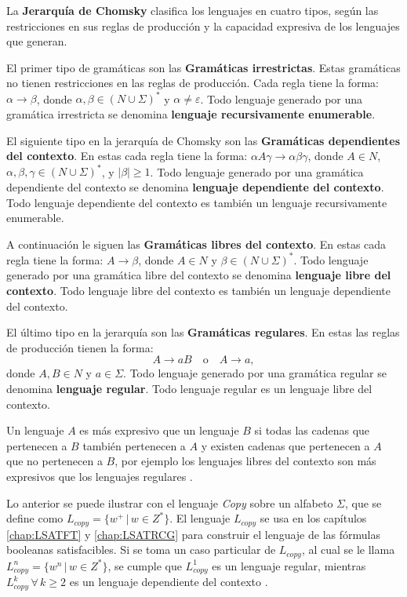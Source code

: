 La \textbf{Jerarquía de Chomsky} clasifica los lenguajes en cuatro tipos, según las restricciones en sus reglas de producción y la capacidad expresiva de los lenguajes que generan.

El primer tipo de gramáticas son las \textbf{Gramáticas irrestrictas}. Estas gramáticas no tienen restricciones en las reglas de producción.
Cada regla tiene la forma: \(\alpha \to \beta\), donde \(\alpha, \beta \in (N \cup \Sigma)^*\) y \(\alpha \neq \varepsilon\).
Todo lenguaje generado por una gramática irrestricta se denomina \textbf{lenguaje recursivamente enumerable}.

El siguiente tipo en la jerarquía de Chomsky son las \textbf{Gramáticas dependientes del contexto}. En estas cada regla tiene la forma: \(\alpha A \gamma \to \alpha \beta \gamma\), donde \(A \in N\), \(\alpha, \beta, \gamma \in (N \cup \Sigma)^*\), y \(|\beta| \geq 1\).
Todo lenguaje generado por una gramática dependiente del contexto se denomina \textbf{lenguaje dependiente del contexto}.
Todo lenguaje dependiente del contexto es también un lenguaje recursivamente enumerable.

A continuación le siguen las \textbf{Gramáticas libres del contexto}. En estas cada regla tiene la forma: \(A \to \beta\), donde \(A \in N\) y \(\beta \in (N \cup \Sigma)^*\).
Todo lenguaje generado por una gramática libre del contexto se denomina \textbf{lenguaje libre del contexto}.
Todo lenguaje libre del contexto es también un lenguaje dependiente del contexto.

El último tipo en la jerarquía son las \textbf{Gramáticas regulares}. En estas las reglas de producción tienen la forma:
\[
  A \to aB \quad \text{o} \quad A \to a,
\]
donde \(A, B \in N\) y \(a \in \Sigma\).
Todo lenguaje generado por una gramática regular se denomina \textbf{lenguaje regular}.
Todo lenguaje regular es un lenguaje libre del contexto.

Un lenguaje $A$ es más expresivo que un lenguaje $B$ si todas las cadenas que pertenecen a $B$ también pertenecen a $A$ y existen cadenas 
que pertenecen a $A$ que no pertenecen a $B$, por ejemplo los lenguajes libres del contexto son más expresivos que los lenguajes regulares \cite{authomataTheory}. 

Lo anterior se puede ilustrar con el lenguaje \textit{Copy} sobre un alfabeto $\Sigma$, que se define como 
$L_{copy}=\{w^+\,|\,w\in Z^*\}$. El lenguaje $L_{copy}$ se usa en los  capítulos \ref{chap:LSATFT} y 
\ref{chap:LSATRCG} para construir el lenguaje de las fórmulas booleanas satisfacibles. 
Si se toma un caso particular de $L_{copy}$, al cual se le llama $L_{copy}^n=\{w^n\,|\,w\in Z^*\}$, se cumple que 
$L_{copy}^1$ es un lenguaje regular, mientras $L_{copy}^k\,\forall\,k\geq 2$ es un lenguaje dependiente del contexto \cite{authomataTheory}.

